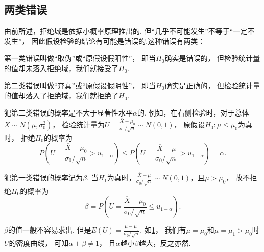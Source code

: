 \subsection{两类错误}
由前所述，拒绝域是依据小概率原理推出的.
但“几乎不可能发生”不等于“一定不发生”，
因此假设检验的结论有可能是错误的.这种错误有两类：

第一类错误叫做“取伪”或“原假设假阳性”，
即当\(H_0\)确实是错误的，
但检验统计量的值却未落入拒绝域，我们就接受了\(H_0\).

第二类错误叫做“弃真”或“原假设假阴性”，
即当\(H_0\)确实是正确的，
但检验统计量的值却落入了拒绝域，我们就拒绝了\(H_0\).

犯第二类错误的概率是不大于显著性水平\(\alpha\)的.
例如，在右侧检验时，对于总体\(X \sim N(\mu,\sigma_0^2)\)，
检验统计量为\(U = \frac{\overline{X}-\mu_0}{\sigma_0 / \sqrt{n}} \sim N(0,1)\)，
原假设\(H_0: \mu\leq\mu_0\)为真时，
拒绝\(H_0\)的概率为\[
	P\left(U=\frac{\overline{X}-\mu_0}{\sigma_0 / \sqrt{n}}>u_{1-\alpha}\right)
	\leq P\left(U=\frac{\overline{X}-\mu}{\sigma_0 / \sqrt{n}}>u_{1-\alpha}\right)
	= \alpha.
\]

犯第一类错误的概率记为\(\beta\).
当\(H_1\)为真时，\(\frac{\overline{X}-\mu}{\sigma_0/\sqrt{n}} \sim N(0,1)\)，且\(\mu>\mu_0\)，
故不拒绝\(H_0\)的概率为\[
	\beta=P\left(U=\frac{\overline{X}-\mu_0}{\sigma_0/\sqrt{n}} \leq u_{1-\alpha}\right).
\]

\(\beta\)的值一般不容易求出.
但是\(E(U)=\frac{\mu-\mu_0}{\sigma_0/\sqrt{n}}\).
如\cref{figure:假设检验.两类错误}，
我们有\(\mu=\mu_0\)和\(\mu=\mu_1>\mu_0\)时\(U\)的密度曲线，
可知\(\alpha+\beta\neq1\)，
且\(\alpha\)越小\(\beta\)越大，反之亦然.

\begin{figure}[htb]
	\centering
	\caption{}
	\label{figure:假设检验.两类错误}
\end{figure}


